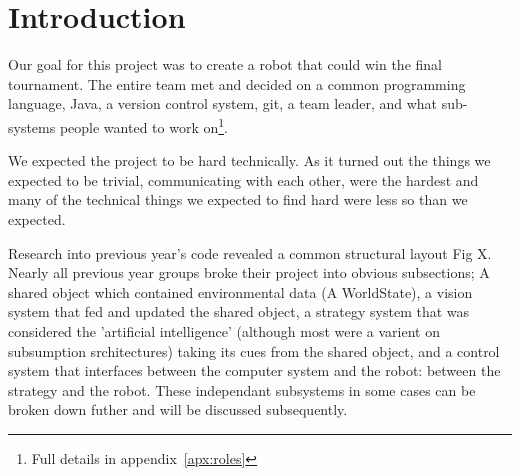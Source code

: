 \section{Introduction}

Our goal for this project was to create a robot that could win the final
tournament. The entire team met and decided on a common programming language,
Java, a version control system, git, a team leader, and what sub-systems people
wanted to work on\footnote{Full details in appendix~\ref{apx:roles}}.

We expected the project to be hard technically. As it turned out the things we
expected to be trivial, communicating with each other, were the hardest and
many of the technical things we expected to find hard were less so than we
expected.

Research into previous year's code revealed a common structural layout Fig X. 
Nearly all previous year groups broke their project into obvious subsections; 
A shared object which contained environmental data (A WorldState), a vision 
system that fed and updated the shared object, a strategy system that was 
considered the 'artificial intelligence' (although most were a varient on subsumption srchitectures) taking its cues from the shared object, and a control 
system that interfaces between the computer system and the robot: between the 
strategy and the robot. These independant subsystems in some cases can be broken 
down futher and will be discussed subsequently. 
